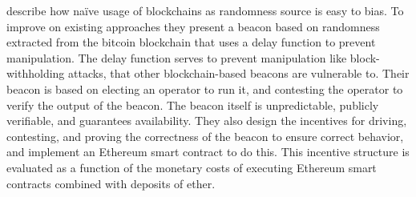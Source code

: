 \citet{bunz2017proofsof} describe how naïve usage of blockchains as randomness source is easy to bias.
To improve on existing approaches they present a beacon based on randomness extracted from the bitcoin blockchain that uses a delay function to prevent manipulation.
The delay function serves to prevent manipulation like block-withholding attacks, that other blockchain-based beacons are vulnerable to.
Their beacon is based on electing an operator to run it, and contesting the operator to verify the output of the beacon. The beacon itself is unpredictable, publicly verifiable, and guarantees availability.
They also design the incentives for driving, contesting, and proving the correctness of the beacon to ensure correct behavior, and implement an Ethereum smart contract to do this.
This incentive structure is evaluated as a function of the monetary costs of executing Ethereum smart contracts combined with deposits of ether.
